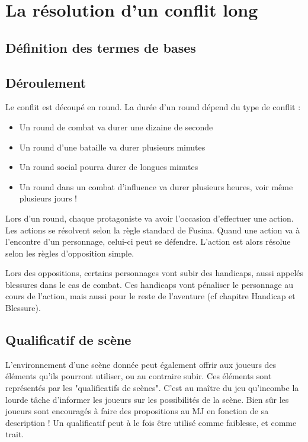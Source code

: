 \documentclass{conf/FusinaClass}
\begin{document}
\chapter{La résolution d'un conflit long}
\section{Définition des termes de bases}
\section{Déroulement}
Le conflit est découpé en round. La durée d’un round dépend du type de conflit :

\begin{itemize}
\item Un round de combat va durer une dizaine de seconde
\item Un round d’une bataille va durer plusieurs minutes
\item Un round social pourra durer de longues minutes
\item Un round dans un combat d’influence va durer plusieurs heures, voir même plusieurs jours !
\end{itemize}

Lors d’un round, chaque protagoniste va avoir l’occasion d’effectuer une action. Les actions se résolvent selon la règle standard de Fusina. Quand une action va à l’encontre d’un personnage, celui-ci peut se défendre. L’action est alors résolue selon les règles d’opposition simple.

Lors des oppositions, certains personnages vont subir des handicaps, aussi appelés blessures dans le cas de combat. Ces handicaps vont pénaliser le personnage au cours de l'action, mais aussi pour le reste de l'aventure (cf chapitre Handicap et Blessure). 

\section{Qualificatif de scène}
L'environnement d'une scène donnée peut également offrir aux joueurs des éléments qu'ils pourront utiliser, ou au contraire subir. Ces éléments sont représentés par les "qualificatifs de scènes". C'est au maître du jeu qu'incombe la lourde tâche d'informer les joueurs sur les possibilités de la scène. Bien sûr les joueurs sont encouragés à faire des propositions au MJ en fonction de sa description ! Un qualificatif peut à le fois être utilisé comme faiblesse, et comme trait.
\end{document}
